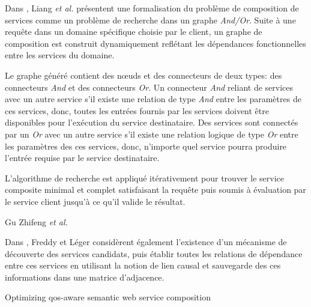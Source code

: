   \begin{text}
    Dans \cite{liang2005and}, Liang \textit{et al.} présentent une
    formalisation du problème de composition de services comme un
    problème de recherche dans un graphe \textit{And/Or}. Suite à une
    requête dans un domaine spécifique choisie par le client, un
    graphe de composition est construit dynamiquement reflétant les
    dépendances fonctionnelles entre les services du domaine.

    Le graphe généré contient des nœuds et des connecteurs de deux
    types: des connecteurs \textit{And} et des connecteurs
    \textit{Or}. Un connecteur \textit{And} reliant de services avec
    un autre service s'il existe une relation de type \textit{And}
    entre les paramètres de ces services, donc, toutes les entrées
    fournis par les services doivent être disponibles pour l'exécution
    du service destinataire. Des services sont connectés par un
    \textit{Or} avec un autre service s'il existe une relation logique
    de type \textit{Or} entre les paramètres des ces services, donc,
    n'importe quel service pourra produire l'entrée requise par le
    service destinataire.

    L'algorithme de recherche est appliqué itérativement pour trouver
    le service composite minimal et complet satisfaisant la requête
    puis soumis à évaluation par le service client jusqu'à ce qu'il
    valide le résultat.

    {\color{red}  %
      Gu Zhifeng \textit{et al.} \cite{gu2008automatic}
    }
  \end{text}

  \begin{text}
    Dans \cite{lecue2006formal}, Freddy et Léger considèrent également
    l'existence d'un mécanisme de découverte des services candidats,
    puis établir toutes les relations de dépendance entre ces services
    en utilisant la notion de lien causal et sauvegarde des ces
    informations dans une matrice d'adjacence.

    {\color{red} %
      Optimizing qos-aware semantic web service composition
      \cite{lecue2009optimizing}
    }
  \end{text}

